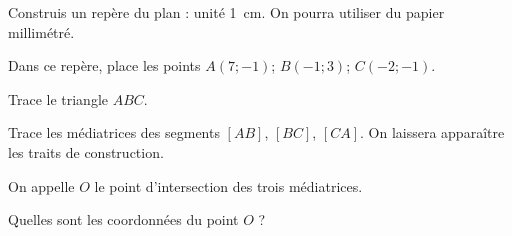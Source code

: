 \begin{myenumerate}
\item Construis un repère du plan : unité 1~cm. On pourra utiliser
du papier millimétré.
\item Dans ce repère, place les points $A(7;-1)$; $B(-1;3)$; $C(-2;-1)$.
\par Trace le triangle $ABC$.
\item Trace les médiatrices des segments $[AB]$, $[BC]$, $[CA]$. On
laissera apparaître les traits de construction.
\item On appelle $O$ le point d'intersection des trois médiatrices.
\par Quelles sont les coordonnées du point $O$ ?
\end{myenumerate}
